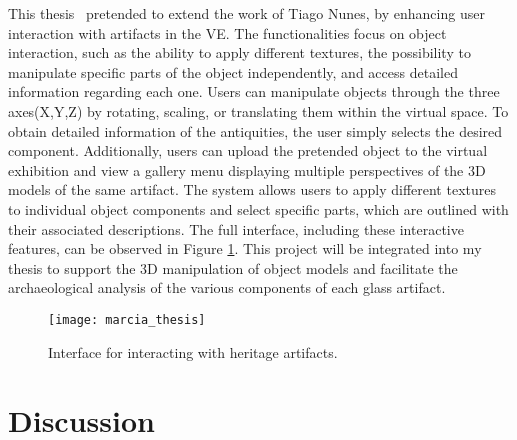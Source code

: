 This thesis~\cite{campanha2024heritage} pretended to extend the work of Tiago Nunes, by enhancing user interaction with 
artifacts in the \gls{VE}. The functionalities focus on object interaction, such as the ability to apply different textures, the possibility to manipulate specific parts of the object independently, and access detailed information regarding each one.
Users can manipulate objects through the three axes(X,Y,Z) by rotating, scaling, or translating them within the virtual space.
To obtain detailed information of the antiquities, the user simply selects the desired component.
Additionally, users can upload the pretended object to the virtual exhibition and view a gallery menu displaying multiple perspectives of the \gls{3D} models of the same artifact.
The system allows users to apply different textures to individual object components and select specific parts, which are outlined with their associated descriptions.
The full interface, including these interactive features, can be observed in Figure \ref{fig:marcia_image}.
This project will be integrated into my thesis to support the \gls{3D} manipulation of object models and facilitate the archaeological analysis of the various components of each glass artifact.

\begin{figure}[h!]
  \centering
  \texttt{[image: marcia\_thesis]}
  \caption{Interface for interacting with heritage artifacts.}
  \label{fig:marcia_image}
\end{figure}
\FloatBarrier


\section{Discussion}
\label{sec:discussion}

\newcommand{\cmark}{\ding{51}} %
\newcommand{\xmark}{\ding{55}} %

